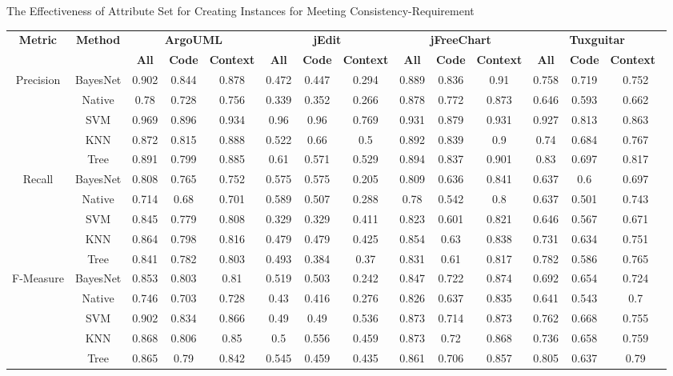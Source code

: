 {\begin{table*}[htbp]
\scriptsize
{The Effectiveness of Attribute Set for Creating Instances for Meeting Consistency-Requirement}
\vspace{0.5em}
\centering
\begin{tabular}{cccccccccccccc}
\toprule[1.5pt]
\multirow{2}{*}{\textbf{Metric}}&\multirow{2}{*}{\textbf{Method}}&\multicolumn{3}{c}{\textbf{ArgoUML}}&\multicolumn{3}{c}{\textbf{jEdit}}&\multicolumn{3}{c}{\textbf{jFreeChart}}&\multicolumn{3}{c}{\textbf{Tuxguitar}}\\
\cline{3-14}
&&\textbf{All}&\textbf{Code}&\textbf{Context}&\textbf{All}&\textbf{Code}&\textbf{Context}&\textbf{All}&\textbf{Code}&\textbf{Context}&\textbf{All}&\textbf{Code}&\textbf{Context}~\\
\midrule[1pt]
\multirow{5}{*}{Precision}
&BayesNet&	0.902	&0.844	&0.878	&	0.472	&0.447	&0.294	&	0.889	&0.836	&0.91	&	0.758	&0.719	&0.752\\
&Native&	0.78&	0.728&	0.756	&	0.339	&0.352	&0.266	&	0.878	&0.772	&0.873	&	0.646	&0.593	&0.662\\
&SVM&	0.969	&0.896	&0.934	&	0.96	&0.96&	0.769	&	0.931	&0.879	&0.931	&	0.927&	0.813	&0.863\\
&KNN&	0.872	&0.815	&0.888		&0.522	&0.66	&0.5		&0.892	&0.839	&0.9	&	0.74&	0.684	&0.767\\
&Tree&	0.891	&0.799&	0.885	&	0.61	&0.571	&0.529	&	0.894	&0.837&	0.901	&	0.83	&0.697	&0.817\\
\hline
\multirow{5}{*}{Recall}
&BayesNet&	0.808	&0.765&	0.752		&0.575	&0.575	&0.205	&	0.809&	0.636&	0.841	&	0.637&	0.6	&0.697\\
&Native&	0.714&	0.68	&0.701	&	0.589	&0.507&	0.288		&0.78	&0.542	&0.8	&	0.637	&0.501	&0.743\\
&SVM&	0.845&	0.779	&0.808	&	0.329	&0.329&	0.411	&	0.823	&0.601&	0.821	&	0.646	&0.567	&0.671\\
&KNN&	0.864&	0.798	&0.816	&	0.479	&0.479&	0.425	&	0.854&	0.63&	0.838		&0.731	&0.634&	0.751\\
&Tree&	0.841&	0.782	&0.803	&	0.493	&0.384&	0.37	&	0.831&	0.61&	0.817	&	0.782	&0.586	&0.765\\
\hline
\multirow{5}{*}{F-Measure}
&BayesNet&	0.853&	0.803&	0.81	&	0.519	&0.503&	0.242	&	0.847&	0.722&	0.874	&	0.692&	0.654&	0.724\\
&Native&	0.746&	0.703	&0.728		&0.43	&0.416	&0.276	&	0.826	&0.637	&0.835		&0.641	&0.543	&0.7\\
&SVM&	0.902&	0.834&	0.866&		0.49&	0.49	&0.536	&	0.873&	0.714	&0.873	&	0.762	&0.668&	0.755\\
&KNN&	0.868&	0.806&	0.85	&	0.5&	0.556	&0.459		&0.873	&0.72	&0.868		&0.736&	0.658	&0.759\\
&Tree&	0.865&	0.79&	0.842	&	0.545&	0.459&	0.435	&	0.861	&0.706&	0.857	&	0.805	&0.637&	0.79\\
\bottomrule[1.5pt]
\end{tabular}
\end{table*}

}
